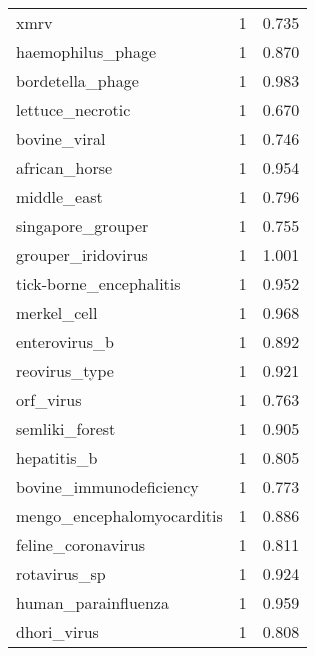 \begin{tabular}{lrr}
                                     xmrv &                   1 &     0.735 \\
                        haemophilus\_phage &                   1 &     0.870 \\
                         bordetella\_phage &                   1 &     0.983 \\
                         lettuce\_necrotic &                   1 &     0.670 \\
                             bovine\_viral &                   1 &     0.746 \\
                            african\_horse &                   1 &     0.954 \\
                              middle\_east &                   1 &     0.796 \\
                        singapore\_grouper &                   1 &     0.755 \\
                       grouper\_iridovirus &                   1 &     1.001 \\
                  tick-borne\_encephalitis &                   1 &     0.952 \\
                              merkel\_cell &                   1 &     0.968 \\
                            enterovirus\_b &                   1 &     0.892 \\
                            reovirus\_type &                   1 &     0.921 \\
                                orf\_virus &                   1 &     0.763 \\
                           semliki\_forest &                   1 &     0.905 \\
                              hepatitis\_b &                   1 &     0.805 \\
                  bovine\_immunodeficiency &                   1 &     0.773 \\
               mengo\_encephalomyocarditis &                   1 &     0.886 \\
                       feline\_coronavirus &                   1 &     0.811 \\
                             rotavirus\_sp &                   1 &     0.924 \\
                      human\_parainfluenza &                   1 &     0.959 \\
                              dhori\_virus &                   1 &     0.808 \\

\end{tabular}

